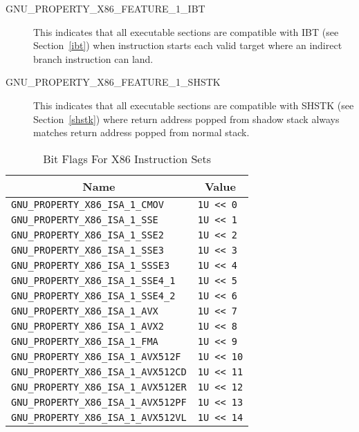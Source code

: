 \begin{description}
 \item[GNU_PROPERTY_X86_FEATURE_1_IBT] This indicates that all executable
   sections are compatible with IBT (see Section~\ref{ibt}) when
    instruction starts each valid target where an indirect
   branch instruction can land.
 \item[GNU_PROPERTY_X86_FEATURE_1_SHSTK] This indicates that all
   executable sections are compatible with SHSTK (see Section~\ref{shstk})
   where return address popped from shadow stack always matches return
   address popped from normal stack.
\end{description}

\begin{table}[H]
\Hrule
  \caption{Bit Flags For X86 Instruction Sets}
  \begin{center}
    \begin{tabular}[t]{l|l}
      \multicolumn{1}{c}{Name} & \multicolumn{1}{c}{Value} \\
      \hline
     \texttt{GNU_PROPERTY_X86_ISA_1_CMOV} & \texttt{1U << 0} \\
     \texttt{GNU_PROPERTY_X86_ISA_1_SSE} & \texttt{1U << 1} \\
     \texttt{GNU_PROPERTY_X86_ISA_1_SSE2} & \texttt{1U << 2} \\
     \texttt{GNU_PROPERTY_X86_ISA_1_SSE3} & \texttt{1U << 3} \\
     \texttt{GNU_PROPERTY_X86_ISA_1_SSSE3} & \texttt{1U << 4} \\
     \texttt{GNU_PROPERTY_X86_ISA_1_SSE4_1} & \texttt{1U << 5} \\
     \texttt{GNU_PROPERTY_X86_ISA_1_SSE4_2} & \texttt{1U << 6} \\
     \texttt{GNU_PROPERTY_X86_ISA_1_AVX} & \texttt{1U << 7} \\
     \texttt{GNU_PROPERTY_X86_ISA_1_AVX2} & \texttt{1U << 8} \\
     \texttt{GNU_PROPERTY_X86_ISA_1_FMA} & \texttt{1U << 9} \\
     \texttt{GNU_PROPERTY_X86_ISA_1_AVX512F} & \texttt{1U << 10} \\
     \texttt{GNU_PROPERTY_X86_ISA_1_AVX512CD} & \texttt{1U << 11} \\
     \texttt{GNU_PROPERTY_X86_ISA_1_AVX512ER} & \texttt{1U << 12} \\
     \texttt{GNU_PROPERTY_X86_ISA_1_AVX512PF} & \texttt{1U << 13} \\
     \texttt{GNU_PROPERTY_X86_ISA_1_AVX512VL} & \texttt{1U << 14} \\

\end{tabular}
\end{center}
\end{table}
